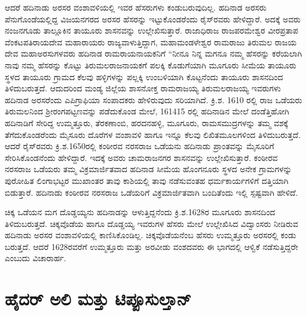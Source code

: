 ಆದರೆ ಹದಿನಾಡು ಅರಸರ ವಂಶಾವಳಿಯಲ್ಲಿ ಇವರ ಹೆಸರುಗಳು ಕಂಡುಬರುವುದಿಲ್ಲ. ಹದಿನಾಡ ಅರಸರು ಪೆನುಗೊಂಡೆಯಲ್ಲಿದ್ದ ವಿಜಯನಗರದ ಅರಸರ ಹೆಸರನ್ನು ಇಟ್ಟುಕೊಂಡರೆಂದು ರೈಸ್​ರವರು ಹೇಳಿದ್ದಾರೆ. ಅದಕ್ಕೆ ಅವರು ನಂಜನಗೂಡು ತಾಲ್ಲೂಕಿನ ತಾಯೂರು ಶಾಸನವನ್ನು ಉಲ್ಲೇಖಿಸುತ್ತಾರೆ. ರಾಜಾಧಿರಾಜ ರಾಜಪರಮೇಶ್ವರ ವೀರಪ್ರತಾಪ ವೆಂಕಟಪತಿರಾಯದೇವ ಮಹಾರಾಯರು ರಾಜ್ಯವಾಳುತ್ತಿದ್ದಾಗ, ಮಹಾಮಂಡಳೇಶ್ವರ ರಾಮರಾಜು ತಿರುಮಲ ರಾಜಯ ದೇವ ಮಹಾಅರಸುಗಳವರು ಹದಿನಾಡ ರಾಮರಾಯನಾಯಕನಿಗೆ “ನೀನೂ ನಿನ್ನ ಮಗನೂ ನಮ್ಮ ಹೆಸರನ್ನು ಕರೆಯಲಾಗಿ ನಾವು ನಮ್ಮ ಹೆಸರನ್ನು ಕೊಟ್ಟು ತಿರುಮಲರಾಜನಾಯಕಗೆ ಪಲಕ್ಕಿ ಕೊಡುಗೆಯಾಗಿ ಮೂಗೂರು ಸೀಮೆಯ ತಾಯೂರು ಸ್ಥಳದ ತಾಯೂರು ಗ್ರಾಮದ ಕೆಲವು ಹಳ್ಳಿಗಳನ್ನು ಪಲ್ಲಕ್ಕಿ ಉಂಬಳಿಯಾಗಿ ಕೊಟ್ಟನೆಂದು ತಾಯೂರು ಶಾಸನದಿಂದ ತಿಳಿದುಬರುತ್ತದೆ. ಆದುದರಿಂದ ಮಂಡ್ಯ ಜಿಲ್ಲೆಯ ಶಾಸನೋಕ್ತ ರಾಮರಾಜಯ್ಯ ತಿರುಮಲರಾಜಯ್ಯ ಇವರುಗಳು ಹದಿನಾಡ ಅರಸರೆಂದು ಎಪಿಗ್ರಾಫಿಯಾ ಸಂಪಾದಕರು ಹೇಳಿರುವುದು ಸರಿಯಾಗಿದೆ. ಕ್ರಿ.ಶ. 1610 ರಲ್ಲಿ ರಾಜ ಒಡೆಯರು ತಿರುಮಲನಿಂದ ಶ‍್ರೀರಂಗಪಟ್ಟಣವನ್ನು ಪಡೆದುಕೊಂಡ ಮೇಲೆ, 1614\enginline{-}15 ರಲ್ಲಿ ಹದಿನಾಡಿನ ಮೇಲೆ ದಂಡೆತ್ತಿಹೋಗಿ ಹದಿನಾಡಿಗೆ ಸೇರಿದ್ದ ಉಮ್ಮತ್ತೂರು, ತೆರಕಣಾಂಬಿ, ಹರದನಹಳ್ಳಿ, ಮೂಗೂರು, ರಾಮಸಮುದ್ರಗಳನ್ನು ತಮ್ಮ ವಶಕ್ಕೆ ತೆಗೆದುಕೊಂಡರೆಂದು ಮೈಸೂರು ದೊರೆಗಳ ವಂಶಾವಳಿ ಹಾಗೂ ಇನ್ನೂ ಕೆಲವು ಲಿಖಿತಮೂಲಗಳಿಂದ ತಿಳಿದುಬರುತ್ತದೆ. ಆದರೆ ರೈಸ್​ರವರು ಕ್ರಿ.ಶ.1650ರಲ್ಲಿ ಕಂಠೀರವ ನರಸರಾಜ ಒಡೆಯನು ಹದಿನಾಡು ಪ್ರಾಂತವನ್ನು ಮೈಸೂರಿಗೆ ಸೇರಿಸಿಕೊಂಡನೆಂದು ಹೇಳಿದ್ದಾರೆ. ಇದಕ್ಕೆ ಅವರು ಚಾಮರಾಜನಗರ ಶಾಸನವನ್ನು ಉಲ್ಲೇಖಿಸುತ್ತಾರೆ. ಕಂಠೀರವ ನರಸರಾಜ ಒಡೆಯರು ತಮ್ಮ ವಿಕ್ರಮಾರ್ಜಿತವಾದ ಹದಿನಾಡ ಸೀಮೆಯ ಹೊಂಗನೂರು ಸ್ಥಳದ ಅನೇಕ ಗ್ರಾಮಗಳನ್ನು ಪುರೋಹಿತ ಲಿಂಗಾಭಟ್ಟರ ಮುಖಾಂತರ ತಾವು ಕಾಶಿಯಲ್ಲಿ ತಾವು ನಡೆಸುವಂತಹ ಧರ್ಮಕಾರ್ಯಗಳಿಗೆ ದತ್ತಿಯಾಗಿ ಬಿಡುತ್ತಾರೆ. ಹದಿನಾಡು ಕಂಠೀರವ ನರಸರಾಜ ಒಡೆಯರಿಗೆ ವಿಕ್ರಮಾರ್ಜಿತವಾಗಿ ಬಂದಿತೆಂದು ಇಲ್ಲಿ ಸ್ಪಷ್ಟವಾಗಿ ಹೇಳಿದೆ.

ಚಿಕ್ಕ ಒಡೆಯನ ಮಗ ದೊಡ್ಡಯ್ಯನು ಹದಿನಾಡನ್ನು ಆಳುತ್ತಿದ್ದನೆಂದು ಕ್ರಿ.ಶ.1628ರ ಮೂಗೂರು ಶಾಸನದಿಂದ ತಿಳಿದುಬರುತ್ತದೆ. ಚಿಕ್ಕವೊಡೆಯ ಹಾಗೂ ದೊಡ್ಡಯ್ಯ ಇವರುಗಳ ಹೆಸರು ಮೇಲೆ ಉಲ್ಲೇಖಿಸಿದ ವಿದ್ವಾಂಸರು ನೀಡಿರುವ ಹದಿನಾಡು ಅರಸರ ವಂಶಾವಳಿಯಲ್ಲಿ ಕಾಣಿಸಿಕೊಂಡಿಲ್ಲ. ಚಿಕ್ಕವೊಡೆಯನೆಂಬ ಹೆಸರು ಉಮ್ಮತ್ತೂರು ಅರಸರಲ್ಲಿ ಕಂಡು ಬರುತ್ತದೆ. ಆದರೆ 1628ರವರೆಗೆ ಉಮ್ಮತ್ತೂರು ಮತ್ತು ಅರವೀಡು ವಂಶದವರು ಈ ಭಾಗದಲ್ಲಿ ಆಳ್ವಿಕೆ ನಡೆಸುತ್ತಿದ್ದರೇ ಎಂಬುದು ವಿಚಾರಾರ್ಹ.

\newpage

\section{ಹೈದರ್​ ಅಲಿ ಮತ್ತು ಟಿಪ್ಪೂಸುಲ್ತಾನ್​}

